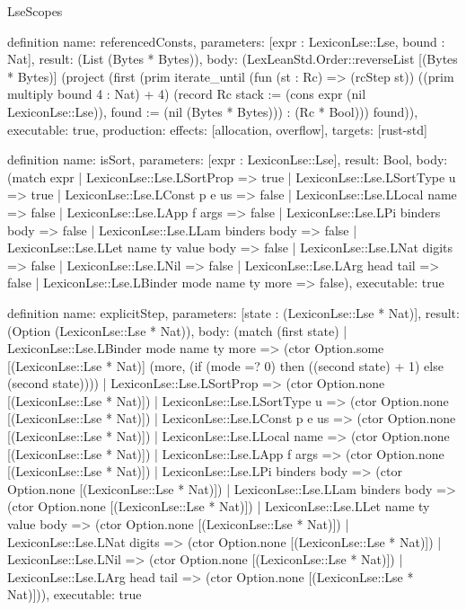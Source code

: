 \begin{lexlean}{LseScopes}
\begin{semanticmodule}
definition{
  name: referencedConsts,
  parameters: [expr : LexiconLse::Lse, bound : Nat],
  result: (List (Bytes * Bytes)),
  body: (LexLeanStd.Order::reverseList [(Bytes * Bytes)] (project (first (prim iterate_until (fun (st : Rc) => (rcStep st)) ((prim multiply bound 4 : Nat) + 4) (record Rc {stack := (cons expr (nil LexiconLse::Lse)), found := (nil (Bytes * Bytes))}) : (Rc * Bool))) found)),
  executable: true,
  production: {effects: [allocation, overflow], targets: [rust-std]}
}

definition{
  name: isSort,
  parameters: [expr : LexiconLse::Lse],
  result: Bool,
  body: (match expr
    | LexiconLse::Lse.LSortProp => true
    | LexiconLse::Lse.LSortType u => true
    | LexiconLse::Lse.LConst p e us => false
    | LexiconLse::Lse.LLocal name => false
    | LexiconLse::Lse.LApp f args => false
    | LexiconLse::Lse.LPi binders body => false
    | LexiconLse::Lse.LLam binders body => false
    | LexiconLse::Lse.LLet name ty value body => false
    | LexiconLse::Lse.LNat digits => false
    | LexiconLse::Lse.LNil => false
    | LexiconLse::Lse.LArg head tail => false
    | LexiconLse::Lse.LBinder mode name ty more => false),
  executable: true
}

definition{
  name: explicitStep,
  parameters: [state : (LexiconLse::Lse * Nat)],
  result: (Option (LexiconLse::Lse * Nat)),
  body: (match (first state)
    | LexiconLse::Lse.LBinder mode name ty more => (ctor Option.some [(LexiconLse::Lse * Nat)] (more, (if (mode =? 0) then ((second state) + 1) else (second state))))
    | LexiconLse::Lse.LSortProp => (ctor Option.none [(LexiconLse::Lse * Nat)])
    | LexiconLse::Lse.LSortType u => (ctor Option.none [(LexiconLse::Lse * Nat)])
    | LexiconLse::Lse.LConst p e us => (ctor Option.none [(LexiconLse::Lse * Nat)])
    | LexiconLse::Lse.LLocal name => (ctor Option.none [(LexiconLse::Lse * Nat)])
    | LexiconLse::Lse.LApp f args => (ctor Option.none [(LexiconLse::Lse * Nat)])
    | LexiconLse::Lse.LPi binders body => (ctor Option.none [(LexiconLse::Lse * Nat)])
    | LexiconLse::Lse.LLam binders body => (ctor Option.none [(LexiconLse::Lse * Nat)])
    | LexiconLse::Lse.LLet name ty value body => (ctor Option.none [(LexiconLse::Lse * Nat)])
    | LexiconLse::Lse.LNat digits => (ctor Option.none [(LexiconLse::Lse * Nat)])
    | LexiconLse::Lse.LNil => (ctor Option.none [(LexiconLse::Lse * Nat)])
    | LexiconLse::Lse.LArg head tail => (ctor Option.none [(LexiconLse::Lse * Nat)])),
  executable: true
}


\end{semanticmodule}
\end{lexlean}
